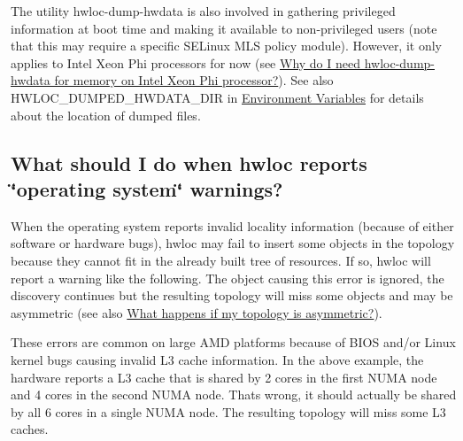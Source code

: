 The utility {\ttfamily hwloc-\/dump-\/hwdata} is also involved in gathering privileged information at boot time and making it available to non-\/privileged users (note that this may require a specific S\+E\+Linux M\+LS policy module). However, it only applies to Intel Xeon Phi processors for now (see \hyperlink{a00394_faq_knl_dump}{Why do I need hwloc-\/dump-\/hwdata for memory on Intel Xeon Phi processor?}). See also {\ttfamily H\+W\+L\+O\+C\+\_\+\+D\+U\+M\+P\+E\+D\+\_\+\+H\+W\+D\+A\+T\+A\+\_\+\+D\+IR} in \hyperlink{a00382}{Environment Variables} for details about the location of dumped files.\hypertarget{a00394_faq_os_error}{}\subsection{What should I do when hwloc reports \char`\"{}operating system\char`\"{} warnings?}\label{a00394_faq_os_error}
When the operating system reports invalid locality information (because of either software or hardware bugs), hwloc may fail to insert some objects in the topology because they cannot fit in the already built tree of resources. If so, hwloc will report a warning like the following. The object causing this error is ignored, the discovery continues but the resulting topology will miss some objects and may be asymmetric (see also \hyperlink{a00394_faq_asymmetric}{What happens if my topology is asymmetric?}).



These errors are common on large A\+MD platforms because of B\+I\+OS and/or Linux kernel bugs causing invalid L3 cache information. In the above example, the hardware reports a L3 cache that is shared by 2 cores in the first N\+U\+MA node and 4 cores in the second N\+U\+MA node. That\textquotesingle{}s wrong, it should actually be shared by all 6 cores in a single N\+U\+MA node. The resulting topology will miss some L3 caches.

